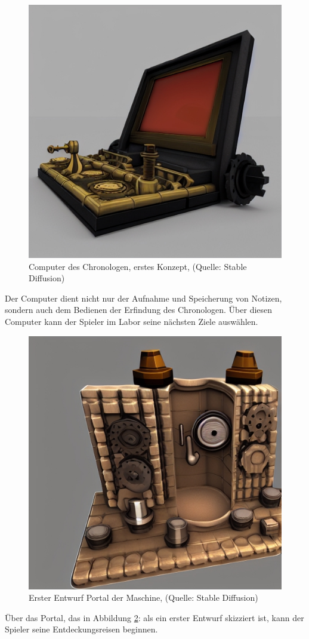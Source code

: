 \begin{figure}[ht]
\centering
\includegraphics[width=0.6\linewidth]{content/pictures/bsp_computer_03.jpg}
\caption{Computer des Chronologen, erstes Konzept, (Quelle: Stable Diffusion)}
\label{fig:bsp_computer_03}
\end{figure}

Der Computer dient nicht nur der Aufnahme und Speicherung von Notizen, sondern auch dem Bedienen der Erfindung des Chronologen. Über diesen Computer kann der Spieler im Labor seine nächsten Ziele auswählen.

\begin{figure}[ht]
\centering
\includegraphics[width=0.6\linewidth]{content/pictures/portal_01.jpg}
\caption{Erster Entwurf Portal der Maschine, (Quelle: Stable Diffusion)}
\label{fig:portal_01}
\end{figure}

Über das Portal, das in Abbildung \ref{fig:portal_01}:  als ein erster Entwurf skizziert ist, kann der Spieler seine Entdeckungsreisen beginnen.

